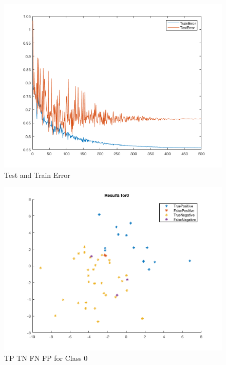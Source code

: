 \documentclass[12pt]{article}
\begin{document}
\begin{figure}[H]
\begin{center}
\includegraphics[scale=0.5]{images/train_test_error}
\caption{Test and Train Error}
\label{default}
\end{center}
\end{figure}
\begin{figure}[H]
\begin{center}
\includegraphics[scale=0.5]{images/class0}
\caption{TP TN FN FP for Class 0}
\label{default}
\end{center}
\end{figure}
\end{document}
